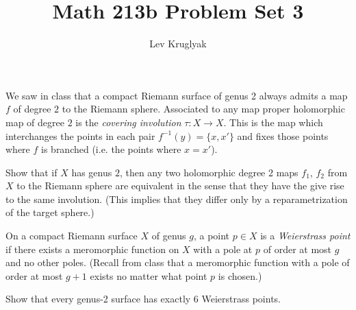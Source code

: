 \documentclass[expanded]{lkx_pset}
\title{Math 213b Problem Set 3}
\author{Lev Kruglyak}
\begin{document}
\maketitle

\begin{problem}{1}
We saw  in class that a compact Riemann surface of
genus 2 always admits a map $f$ of degree $2$ to the Riemann sphere.
Associated to any map proper holomorphic map of degree $2$ is the
\emph{covering involution} $\tau: X\to X$. This is the map which
interchanges the points in each pair $f^{-1}(y)=\{x, x'\}$ and fixes those
points where $f$ is branched (i.e. the points where $x=x'$).

\end{problem}

\begin{parts}
	\begin{part}{}
		Show that if $X$ has genus $2$, then any two holomorphic degree 2 maps $f_{1}$,
		$f_{2}$ from $X$ to the Riemann sphere are equivalent in the sense
		that they have the give rise to the same involution. (This implies
		that they differ only by a reparametrization of the target sphere.)
	\end{part}
\end{parts}

\begin{problem}{2}
On a compact Riemann surface  $X$ of genus $g$, a point $p\in X$ is a
\emph{Weierstrass point} if there exists a meromorphic function on
$X$ with a pole at $p$ of order at most $g$ and no other poles.
(Recall from class that a meromorphic function with a pole of order
at most $g+1$ exists no matter what point $p$ is chosen.)

\end{problem}

\begin{parts}
	\begin{part}{}
		Show that every genus-2 surface has exactly $6$ Weierstrass points.
	\end{part}
\end{parts}
\end{document}
